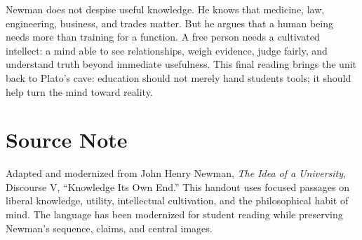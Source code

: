 \documentclass[12pt]{article}
\begin{document}
Newman does not despise useful knowledge. He knows that medicine, law, engineering, business, and trades matter. But he argues that a human being needs more than training for a function. A free person needs a cultivated intellect: a mind able to see relationships, weigh evidence, judge fairly, and understand truth beyond immediate usefulness. This final reading brings the unit back to Plato's cave: education should not merely hand students tools; it should help turn the mind toward reality.

\section*{Source Note}
Adapted and modernized from John Henry Newman, \textit{The Idea of a University}, Discourse V, ``Knowledge Its Own End.'' This handout uses focused passages on liberal knowledge, utility, intellectual cultivation, and the philosophical habit of mind. The language has been modernized for student reading while preserving Newman's sequence, claims, and central images.
\end{document}
